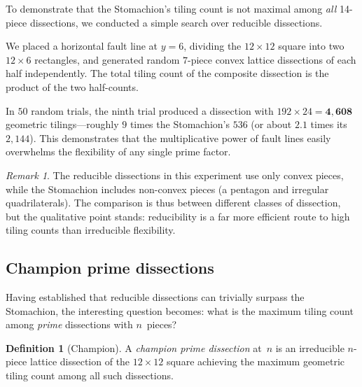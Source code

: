 \documentclass[12pt]{article}
\theoremstyle{definition}
\newtheorem{definition}[theorem]{Definition}
\theoremstyle{remark}
\newtheorem{remark}[theorem]{Remark}
\begin{document}
To demonstrate that the Stomachion's tiling count is not maximal among
\emph{all} 14-piece dissections, we conducted a simple search over
reducible dissections.

We placed a horizontal fault line at $y = 6$, dividing the $12 \times 12$
square into two $12 \times 6$ rectangles, and generated random $7$-piece
convex lattice dissections of each half independently. The total tiling
count of the composite dissection is the product of the two half-counts.

In $50$ random trials, the ninth trial produced a dissection with
$192 \times 24 = \mathbf{4{,}608}$ geometric tilings---roughly $9$ times
the Stomachion's $536$ (or about $2.1$ times its $2{,}144$). This
demonstrates that the multiplicative power of fault lines easily
overwhelms the flexibility of any single prime factor.

\begin{remark}
The reducible dissections in this experiment use only convex pieces,
while the Stomachion includes non-convex pieces (a pentagon and irregular
quadrilaterals). The comparison is thus between different classes of
dissection, but the qualitative point stands: reducibility is a far more
efficient route to high tiling counts than irreducible flexibility.
\end{remark}

\subsection{Champion prime dissections}
\label{sec:champions}

Having established that reducible dissections can trivially surpass the
Stomachion, the interesting question becomes: what is the maximum tiling
count among \emph{prime} dissections with $n$~pieces?

\begin{definition}[Champion]
A \emph{champion prime dissection} at~$n$ is an irreducible $n$-piece
lattice dissection of the $12 \times 12$ square achieving the maximum
geometric tiling count among all such dissections.
\end{definition}
\end{document}
